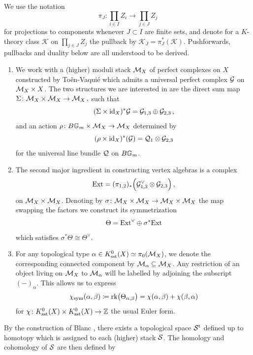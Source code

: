 \documentclass[a4paper, 12pt]{amsart}
\begin{document}
We use the notation
$$
\pi_{J}\colon\prod_{i\in I}Z_i\longrightarrow \prod_{j\in J}Z_j
$$
for projections to components whenever $J\subset I$ are finite sets,
and denote for a $K$-theory class $\mathcal{K}$ on $\prod_{j\in J}Z_j$ the pullback by $\mathcal{K}_J =\pi^\ast_{J}(\mathcal{K})$. Pushforwards, pullbacks and duality below are all understood to be derived.
\begin{definition}
\label{def: VOAconstruction}
\begin{enumerate}
\item We work with a (higher) moduli stack $\mathcal{M}_X$ of perfect complexes on $X$ constructed by Toën-Vaquié \cite{TV07} which admits a universal perfect complex ${\mathcal G}$ on $ \mathcal{M}_X\times X$.  The two structures we are interested in are the direct sum map 
$\Sigma\colon\mathcal{M}_X\times \mathcal{M}_X\to \mathcal{M}_X
\,,$
such that 
$$
(\Sigma\times\operatorname{id}_X)^\ast {\mathcal G} = {\mathcal G}_{1,3}\oplus {\mathcal G}_{2,3}\,,
$$
and an action $\rho\colon B{\mathbb{G}}_m\times\mathcal{M}_X\to \mathcal{M}_X$ determined by
$$
(\rho\times \operatorname{id}_X)^\ast({\mathcal G}) = {\mathcal Q}_1\otimes {\mathcal G}_{2,3}
$$
for the universal line bundle ${\mathcal Q}$ on $B{\mathbb{G}}_m$.
   \item The second major ingredient in constructing vertex algebras is a complex
    \begin{equation}
    \label{Eq: Extcomplex}
    \textup{Ext} = (\pi_{1,2})_\ast\Big({\mathcal G}_{1,3}^\vee\otimes {\mathcal G}_{2,3}\Big)\,,    \end{equation}
   on ${\mathcal M}_X\times {\mathcal M}_X$. Denoting by  $\sigma\colon \mathcal{M}_X\times \mathcal{M}_X\to \mathcal{M}_X\times \mathcal{M}_X$ the map swapping the factors we construct its symmetrization
    $$
    \Theta = \textup{Ext}^\vee\oplus \sigma^\ast\textup{Ext}
    $$
    which satisfies
    $
   \sigma^* \Theta\cong \Theta^\vee.
    $
    \item For any topological type $\alpha\in K_{\text{sst}}^0(X)\simeq \pi_0(\mathcal{M}_X)$, we denote the corresponding connected component by $\mathcal{M}_{\alpha}\subseteq {\mathcal M}_X$. Any restriction of an object living on $\mathcal{M}_X$ to $\mathcal{M}_{\alpha}$ will be labelled by adjoining the subscript $(-)_{\alpha}$. This allows us to express
    $$
   \chi_{\text{sym}}(\alpha,\beta)\coloneqq \mathrm{rk}\big(\Theta_{\alpha,\beta}\big) = \chi(\alpha,\beta) + \chi(\beta,\alpha)
    $$
    for $\chi\colon K_{\text{sst}}^0(X)\times K_{\text{sst}}^0(X)\to {\mathbb{Z}}$ the usual Euler form. 
 \end{enumerate}
\end{definition}
By the construction of Blanc \cite[Section 3.4]{B16}, there exists a topological space ${\mathcal S}^{\text{t}}$ defined up to homotopy which is assigned to each (higher) stack ${\mathcal S}$. The homology and cohomology of ${\mathcal S}$ are then defined by 
\end{document}
